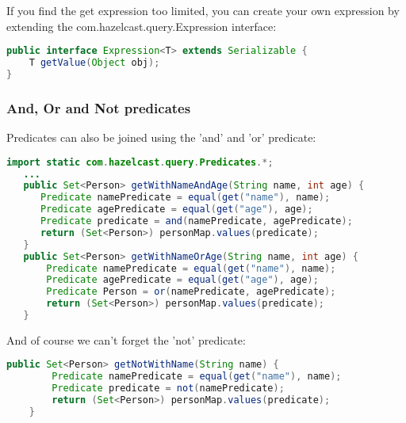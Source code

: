 If you find the get expression too limited, you can create your own expression by extending the com.hazelcast.query.Expression interface:
\begin{lstlisting}[language=java]
public interface Expression<T> extends Serializable {
    T getValue(Object obj);
}
\end{lstlisting}

\subsubsection*{And, Or and Not predicates}
Predicates can also be joined using the 'and' and 'or' predicate:
\begin{lstlisting}[language=java]
import static com.hazelcast.query.Predicates.*;
   ...
   public Set<Person> getWithNameAndAge(String name, int age) {
      Predicate namePredicate = equal(get("name"), name);
      Predicate agePredicate = equal(get("age"), age);
      Predicate predicate = and(namePredicate, agePredicate);
      return (Set<Person>) personMap.values(predicate);
   }
   public Set<Person> getWithNameOrAge(String name, int age) {
       Predicate namePredicate = equal(get("name"), name);
       Predicate agePredicate = equal(get("age"), age);
       Predicate Person = or(namePredicate, agePredicate);
       return (Set<Person>) personMap.values(predicate);
   }
\end{lstlisting}
And of course we can't forget the 'not' predicate:
\begin{lstlisting}[language=java]
    public Set<Person> getNotWithName(String name) {
        Predicate namePredicate = equal(get("name"), name);
        Predicate predicate = not(namePredicate);
        return (Set<Person>) personMap.values(predicate);
    }
\end{lstlisting}


